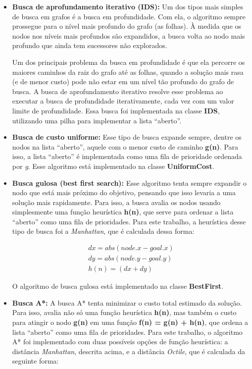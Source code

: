 \documentclass[12pt]{article}
\begin{document}
\begin{itemize}
	\item \textbf{Busca de aprofundamento iterativo (IDS):} Um dos tipos mais simples de busca em grafos é a busca em profundidade. Com ela, o algoritmo sempre prossegue para o nível mais profundo do grafo (as folhas). À medida que os nodos nos níveis mais profundos são expandidos, a busca volta ao nodo mais profundo que ainda tem sucessores não explorados.

	Um dos principais problema da busca em profundidade é que ela percorre os maiores caminhos da raiz do grafo até as folhas, quando a solução mais rasa (e de menor custo) pode não estar em um nível tão profundo do grafo de busca. A busca de aprofundamento iterativo resolve esse problema ao executar a busca de profundidade iterativamente, cada vez com um valor limite de profundidade. Essa busca foi implementada na classe \textbf{IDS}, utilizando uma pilha para implementar a lista ``aberto''.

	\item \textbf{Busca de custo uniforme:} Esse tipo de busca expande sempre, dentre os nodos na lista ``aberto'', aquele com o menor custo de caminho \textbf{g(n)}. Para isso, a lista ``aberto'' é implementada como uma fila de prioridade ordenada por \textit{g}. Esse algoritmo está implementado na classe \textbf{UniformCost}.

	\item \textbf{Busca gulosa (best first search):} Esse algoritmo tenta sempre expandir o nodo que está mais próximo do objetivo, pensando que isso levaria a uma solução mais rapidamente. Para isso, a busca avalia os nodos usando simplesmente uma função heurística \textbf{h(n)}, que serve para ordenar a lista ``aberto'' como uma fila de prioridades. Para este trabalho, a heurística desse tipo de busca foi a \textit{Manhattan}, que é calculada dessa forma:

	\begin{align*}
		dx = abs(node.x - goal.x) \\
		dy = abs(node.y - goal.y) \\
		h(n) = (dx + dy)
	\end{align*}

	O algoritmo de busca gulosa está implementado na classe \textbf{BestFirst}.

	\item \textbf{Busca A*:} A busca A* tenta minimizar o custo total estimado da solução. Para isso, avalia não só uma função heurística \textbf{h(n)}, mas também o custo para atingir o nodo \textbf{g(n)} em uma função \textbf{f(n) = g(n) + h(n)}, que ordena a lista ``aberto'' como uma fila de prioridades. Para este trabalho, o algoritmo A* foi implementado com duas possíveis opções de função heurística: a distância \textit{Manhattan}, descrita acima, e a distância \textit{Octile}, que é calculada da seguinte forma:


\end{itemize}
\end{document}
